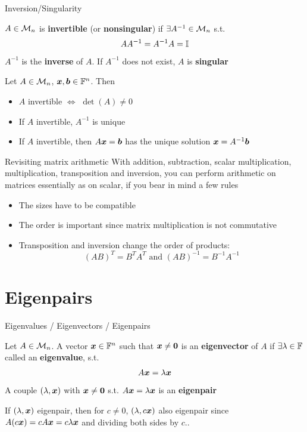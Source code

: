 \documentclass[aspectratio=169]{beamer}\usepackage[]{graphicx}\usepackage[]{xcolor}
\begin{document}
\begin{frame}{Inversion/Singularity}
\begin{definition}
$A\in\mathcal{M}_n$ is \textbf{invertible} (or \textbf{nonsingular}) if $\exists A^{-1}\in\mathcal{M}_n$ s.t.
\[
AA^{-1}=A^{-1}A=\mathbb{I}
\]
$A^{-1}$ is the \textbf{inverse} of $A$. If $A^{-1}$ does not exist, $A$ is \textbf{singular}
\end{definition}
\begin{importanttheorem}
Let $A\in\mathcal{M}_n$, $\bm{x},\bm{b}\in\mathbb{F}^n$. Then
\begin{itemize}
	\item $A$ invertible $\iff$ $\det(A)\neq 0$
	\item If $A$ invertible, $A^{-1}$ is unique
	\item If $A$ invertible, then $A\bm{x}=\bm{b}$ has the unique solution $\bm{x}=A^{-1}\bm{b}$
\end{itemize}
\end{importanttheorem}
\end{frame}

\begin{frame}{Revisiting matrix arithmetic}
With addition, subtraction, scalar multiplication, multiplication, transposition and inversion, you can perform arithmetic on matrices essentially as on scalar, if you bear in mind a few rules
\begin{itemize}
\item The sizes have to be compatible
\item The order is important since matrix multiplication is not commutative
\item Transposition and inversion change the order of products:
\[
(AB)^T=B^TA^T\textrm{ and }(AB)^{-1}=B^{-1}A^{-1}
\]
\end{itemize}
\end{frame}


\section{Eigenpairs}

\begin{frame}{Eigenvalues / Eigenvectors / Eigenpairs}
\begin{definition}
Let $A\in\mathcal{M}_n$. A vector $\bm{x}\in\mathbb{F}^n$ such that $\bx\neq\b0$ is an \textbf{eigenvector} of $A$ if $\exists\lambda\in\mathbb{F}$ called an \textbf{eigenvalue}, s.t.
\[
A\bm{x}=\lambda \bm{x}
\]
A couple $(\lambda,\bm{x})$ with $\bx\neq\b0$ s.t. $A\bm{x}=\lambda\bm{x}$ is an \textbf{eigenpair}
\end{definition}
\vfill
If $(\lambda,\bm{x})$ eigenpair, then for $c\neq 0$, $(\lambda,c\bm{x})$ also eigenpair since $A(c\bm{x})=cA\bm{x}=c\lambda\bm{x}$ and dividing both sides by $c$..
\end{frame}






\end{document}
